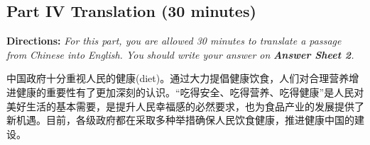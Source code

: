 \documentclass[UTF8,11pt]{ctexart}
\begin{document}
\subsection*{\textbf{Part IV Translation (30 minutes)}}


\textbf{Directions: }\textit{For this part, you are allowed 30 minutes to translate a passage from Chinese into English. You} \textit{should write your answer on }\textbf{\textit{Answer Sheet 2}}\textit{.}


中国政府十分重视人民的健康(diet)。通过大力提倡健康饮食，人们对合理营养增进健康的重要性有了更加深刻的认识。“吃得安全、吃得营养、吃得健康”是人民对美好生活的基本需要，是提升人民幸福感的必然要求，也为食品产业的发展提供了新机遇。目前，各级政府都在采取多种举措确保人民饮食健康，推进健康中国的建设。
\end{document}
